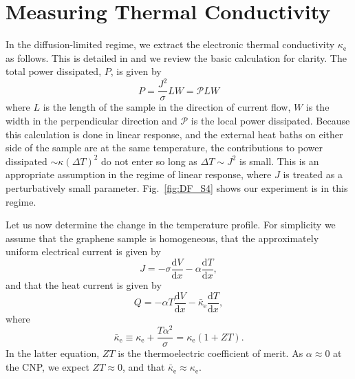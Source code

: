 \section{Measuring Thermal Conductivity}
In the diffusion-limited regime, we extract the electronic thermal conductivity $\kappa_{\mathrm{e}}$ as follows.    This is detailed in \cite{fong_ultrasensitive_2012} and we review the basic calculation for clarity.   The total power dissipated, $P$, is given by \begin{equation}
P = \frac{J^2}{\sigma} LW = \mathcal{P}LW  \label{eq:DF_eqp2}
\end{equation}
where $L$ is the length of the sample in the direction of current flow,  $W$ is the width in the perpendicular direction and $\mathcal{P}$ is the local power dissipated.  Because this calculation is done in linear response, and the external heat baths on either side of the sample are at the same temperature,  the contributions to power dissipated $\sim \kappa (\Delta T)^2$ do not enter so long as $\Delta T \sim J^2$ is  small.   This is an appropriate assumption in the regime of linear response, where $J$ is treated as a perturbatively small parameter.    Fig.~\ref{fig:DF_S4} shows our experiment is in this regime.

Let us now determine the change in the temperature profile.   For simplicity we assume that the graphene sample is homogeneous, that the approximately uniform electrical current is given by \begin{equation}
J = -\sigma \frac{\mathrm{d}V}{\mathrm{d}x} - \alpha \frac{\mathrm{d}T}{\mathrm{d}x},
\end{equation}
and that the heat current is given by \begin{equation}
Q = -\alpha T\frac{\mathrm{d}V}{\mathrm{d}x} - \bar\kappa_{\mathrm{e}} \frac{\mathrm{d}T}{\mathrm{d}x},
\end{equation}
where \begin{equation}
\bar\kappa_{\mathrm{e}} \equiv \kappa_{\mathrm{e}} + \frac{T\alpha^2}{\sigma} = \kappa_{\mathrm{e}}(1+ZT).
\end{equation}
In the latter equation,  $ZT$ is the thermoelectric coefficient of merit.    As $\alpha \approx 0$ at the CNP,  we expect $ZT\approx 0$,  and that $\bar\kappa_{\mathrm{e}}\approx \kappa_{\mathrm{e}}$. 

